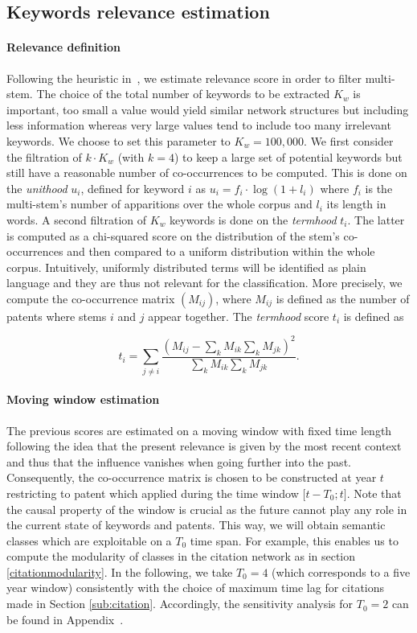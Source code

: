 \documentclass[12pt,twoside,a4paper]{article}
\begin{document}
\subsection{Keywords relevance estimation}
\label{keywords_est}
\paragraph{Relevance definition}

Following the heuristic in~\cite{chavalarias2013phylomemetic}, we estimate relevance score in order to filter multi-stem. The choice of the total number of keywords to be extracted $K_w$ is important, too small a value would yield similar network structures but including less information whereas very large values tend to include too many irrelevant keywords. We choose to set this parameter to $K_w = 100,000$. We first consider the filtration of $k\cdot K_w$ (with $k=4$) to keep a large set of potential keywords but still have a reasonable number of co-occurrences to be computed. This is done on the \emph{unithood} $u_i$, defined for keyword $i$ as $u_i = f_i\cdot \log{(1 + l_i)}$ where $f_i$ is the multi-stem's number of apparitions over the whole corpus and $l_i$ its length in words. A second filtration of $K_w$ keywords is done on the \emph{termhood} $t_i$. The latter is computed as a chi-squared score on the distribution of the stem's co-occurrences and then compared to a uniform distribution within the whole corpus. Intuitively, uniformly distributed terms will be identified as plain language and they are thus not relevant for the classification. More precisely, we compute the co-occurrence matrix $(M_{ij})$, where $M_{ij}$ is defined as the number of patents where stems $i$ and $j$ appear together. The \emph{termhood} score $t_i$ is defined as

\[
t_i = \sum_{j\neq i}\frac{\left( M_{ij} - \sum_{k}M_{ik} \sum_{k} M_{jk}\right)^2}{\sum_{k}M_{ik} \sum_{k} M_{jk}}.
\]

\paragraph{Moving window estimation}
The previous scores are estimated on a moving window with fixed time length following the idea that the present relevance is given by the most recent context and thus that the influence vanishes when going further into the past. Consequently, the co-occurrence matrix is chosen to be constructed at year $t$ restricting to patent which applied during the time window $\big[ t - T_0 ; t \big]$. Note that the causal property of the window is crucial as the future cannot play any role in the current state of keywords and patents. This way, we will obtain semantic classes which are exploitable on a $T_0$ time span. For example, this enables us to compute the modularity of classes in the citation network as in section \ref{citationmodularity}. In the following, we take $T_0 = 4$ (which corresponds to a five year window) consistently with the choice of maximum time lag for citations made in Section \ref{sub:citation}. Accordingly, the sensitivity analysis for $T_0=2$ can be found in Appendix~.
\end{document}
